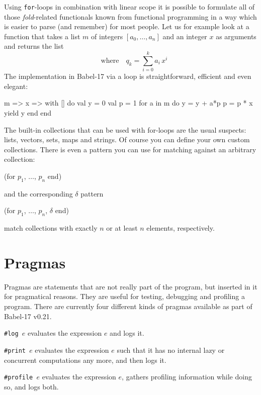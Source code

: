 \documentclass[11pt]{amsart}
\newcommand{\babelsrc}[1] {\lstinline!#1!}
\begin{document}
Using \babelsrc{for}-loops in combination with linear scope it is possible to formulate all of those \emph{fold}-related functionals known from functional programming in a way which is easier to parse (and remember) for most people. Let us for example look at a function that takes a list $m$ of integers $[a_0, \ldots, a_n]$ and an integer $x$ as arguments and returns the list
\begin{displaymath}
	[q_0, \ldots, q_n] \quad \text{where} \quad q_k = \sum_{i=0}^k a_i\, x^i
\end{displaymath}
The implementation in Babel-17 via a loop is straightforward, efficient and even elegant:
\begin{babellisting}
m => x => 
  with [] do 
    val y = 0
    val p = 1
    for a in m do 
      y = y + a*p
      p = p * x
      yield y
    end
 end
\end{babellisting}

The built-in collections that can be used with for-loops are the usual suspects: lists, vectors, sets, maps and strings. Of course you can define your own custom collections. There is even a pattern you can use for matching against an arbitrary collection:
\begin{babellisting}
(for $p_1$, $\ldots$, $p_n$ end)
\end{babellisting}
and the corresponding $\delta$ pattern
\begin{babellisting}
(for $p_1$, $\ldots$, $p_n$, $\delta$ end)
\end{babellisting}
match collections with exactly $n$ or at least $n$ elements, respectively. 

\section{Pragmas}
Pragmas are statements that are not really part of the program, but inserted in it for pragmatical reasons. They are useful for testing, debugging and profiling a program. There are currently four different kinds of  pragmas available as part of Babel-17 v0.21.

\texttt{\#log $e$} evaluates the expression $e$ and logs it. 

\texttt{\#print $e$} evaluates the expression $e$ such that it has no internal lazy or concurrent computations any more, and then logs it.

\texttt{\#profile $e$} evaluates the expression $e$, gathers profiling information while doing so, and logs both.
\end{document}
